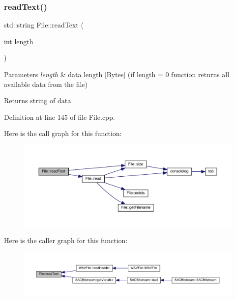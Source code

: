 \subsubsection{\texorpdfstring{read\+Text()}{readText()}}
{\footnotesize\ttfamily std\+::string File\+::read\+Text (\begin{DoxyParamCaption}\item[{int}]{length }\end{DoxyParamCaption})}


\begin{DoxyParams}{Parameters}
{\em length} & data length \mbox{[}Bytes\mbox{]} (if length = 0 function returns all available data from the file) \\
\hline
\end{DoxyParams}
\begin{DoxyReturn}{Returns}
string of data 
\end{DoxyReturn}


Definition at line 145 of file File.\+cpp.

Here is the call graph for this function\+:
\nopagebreak
\begin{figure}[H]
\begin{center}
\leavevmode
\includegraphics[width=350pt]{class_file_a01b5902198fefc46fe835f42386ce047_cgraph}
\end{center}
\end{figure}
Here is the caller graph for this function\+:
\nopagebreak
\begin{figure}[H]
\begin{center}
\leavevmode
\includegraphics[width=350pt]{class_file_a01b5902198fefc46fe835f42386ce047_icgraph}
\end{center}
\end{figure}
\mbox{\label{class_file_a3320ff9a60903cdae6eb7f3fff06b05c}} 
